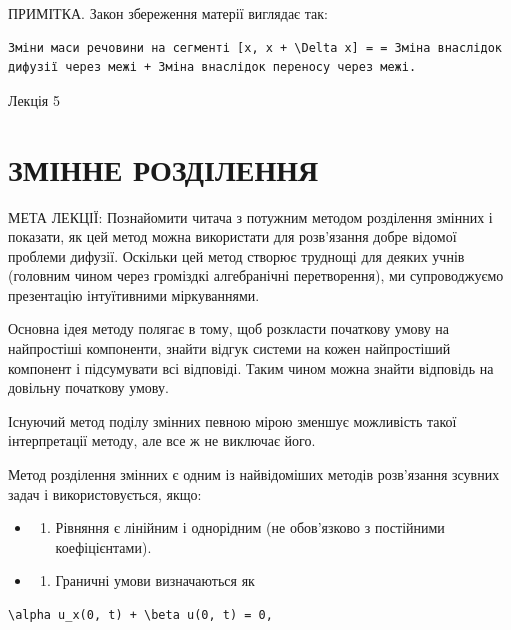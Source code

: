 \documentclass[
  ukrainian,
]{article}
\providecommand{\tightlist}{%
  \setlength{\itemsep}{0pt}\setlength{\parskip}{0pt}}
\begin{document}
ПРИМІТКА. Закон збереження матерії виглядає так:

\begin{verbatim}
Зміни маси речовини на сегменті [x, x + \Delta x] = = Зміна внаслідок дифузії через межі + Зміна внаслідок переносу через межі.
\end{verbatim}

Лекція 5

\section{ЗМІННЕ
РОЗДІЛЕННЯ}\label{ux437ux43cux456ux43dux43dux435-ux440ux43eux437ux434ux456ux43bux435ux43dux43dux44f}

МЕТА ЛЕКЦІЇ: Познайомити читача з потужним методом розділення змінних і
показати, як цей метод можна використати для розв'язання добре відомої
проблеми дифузії. Оскільки цей метод створює труднощі для деяких учнів
(головним чином через громіздкі алгебранічні перетворення), ми
супроводжуємо презентацію інтуїтивними міркуваннями.

Основна ідея методу полягає в тому, щоб розкласти початкову умову на
найпростіші компоненти, знайти відгук системи на кожен найпростіший
компонент і підсумувати всі відповіді. Таким чином можна знайти
відповідь на довільну початкову умову.

Існуючий метод поділу змінних певною мірою зменшує можливість такої
інтерпретації методу, але все ж не виключає його.

Метод розділення змінних є одним із найвідоміших методів розв'язання
зсувних задач і використовується, якщо:

\begin{itemize}
\tightlist
\item
  \begin{enumerate}
  \def\labelenumi{\arabic{enumi}.}
  \tightlist
  \item
    Рівняння є лінійним і однорідним (не обов'язково з постійними
    коефіцієнтами).
  \end{enumerate}
\item
  \begin{enumerate}
  \def\labelenumi{\arabic{enumi}.}
  \setcounter{enumi}{1}
  \tightlist
  \item
    Граничні умови визначаються як
  \end{enumerate}
\end{itemize}

\begin{verbatim}
\alpha u_x(0, t) + \beta u(0, t) = 0,
\end{verbatim}
\end{document}
